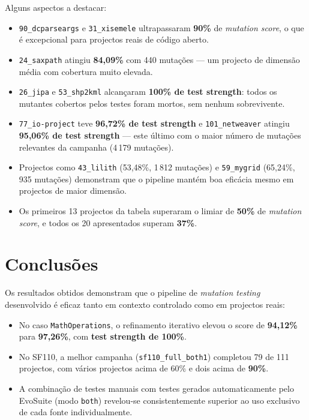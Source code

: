 \documentclass[12pt,a4paper]{article}
\begin{document}
Alguns aspectos a destacar:

\begin{itemize}
  \item \texttt{90\_dcparseargs} e \texttt{31\_xisemele} ultrapassaram \textbf{90\%} de
        \textit{mutation score}, o que é excepcional para projectos reais de código aberto.

  \item \texttt{24\_saxpath} atingiu \textbf{84,09\%} com 440 mutações --- um projecto de
        dimensão média com cobertura muito elevada.

  \item \texttt{26\_jipa} e \texttt{53\_shp2kml} alcançaram \textbf{100\% de test strength}:
        todos os mutantes cobertos pelos testes foram mortos, sem nenhum sobrevivente.

  \item \texttt{77\_io-project} teve \textbf{96,72\% de test strength} e
        \texttt{101\_netweaver} atingiu \textbf{95,06\% de test strength} --- este último com
        o maior número de mutações relevantes da campanha (4\,179 mutações).

  \item Projectos como \texttt{43\_lilith} (53,48\%, 1\,812 mutações) e
        \texttt{59\_mygrid} (65,24\%, 935 mutações) demonstram que o pipeline mantém
        boa eficácia mesmo em projectos de maior dimensão.

  \item Os primeiros 13 projectos da tabela superaram o limiar de \textbf{50\%} de
        \textit{mutation score}, e todos os 20 apresentados superam \textbf{37\%}.
\end{itemize}

\section{Conclusões}

Os resultados obtidos demonstram que o pipeline de \textit{mutation testing} desenvolvido é
eficaz tanto em contexto controlado como em projectos reais:

\begin{itemize}
  \item No caso \texttt{MathOperations}, o refinamento iterativo elevou o score de
        \textbf{94,12\%} para \textbf{97,26\%}, com \textbf{test strength de 100\%}.
  \item No SF110, a melhor campanha (\texttt{sf110\_full\_both1}) completou 79 de 111 projectos,
        com vários projectos acima de 60\% e dois acima de \textbf{90\%}.
  \item A combinação de testes manuais com testes gerados automaticamente pelo EvoSuite
        (modo \texttt{both}) revelou-se consistentemente superior ao uso exclusivo de cada
        fonte individualmente.
\end{itemize}
\end{document}
